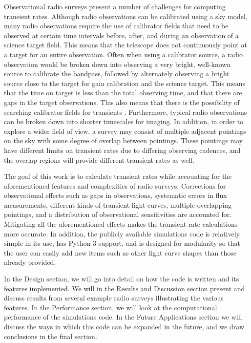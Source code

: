 \documentclass[12pt]{article}
\begin{document}
Observational radio surveys present a number of challenges for computing transient rates. Although radio observations can be calibrated using a sky model, many radio observations require the use of calibrator fields that need to be observed at certain time intervals before, after, and during an observation of a science target field. This means that the telescope does not continuously point at a target for an entire observation. Often when using a calibrator source, a radio observation would be broken down into observing a very bright, well-known source to calibrate the bandpass, followed by alternately observing a bright source close to the target for gain calibration and the science target. This means that the time on target is less than the total observing time, and that there are gaps in the target observations. This also means that there is the possibility of searching calibrator fields for transients \citep{2011ApJ...728L..14B}. Furthermore, typical radio observations can be broken down into shorter timescales for imaging. In addition, in order to explore a wider field of view, a survey may consist of multiple adjacent pointings on the sky with some degree of overlap between pointings. These pointings may have different limits on transient rates due to differing observing cadences, and the overlap regions will provide different transient rates as well.

The goal of this work is to calculate transient rates while accounting for the aforementioned features and complexities of radio surveys. Corrections for observational effects such as gaps in observations, systematic errors in flux measurements, different kinds of transient light curves, multiple overlapping pointings, and a distribution of observational sensitivities are accounted for. Mitigating all the aforementioned effects makes the transient rate calculations more accurate. In addition, the publicly available simulations code is relatively simple in its use, has Python 3 support, and is designed for modularity so that the user can easily add new items such as other light curve shapes than those already provided.

In the Design section, we will go into detail on how the code is written and its features implemented. We will in the Results and Discussion section present and discuss results from several example radio surveys illustrating the various features. In the Performance section, we will look at the computational performance of the simulations code. In the Future Applications section we will discuss the ways in which this code can be expanded in the future, and we draw conclusions in the final section. 
\end{document}
